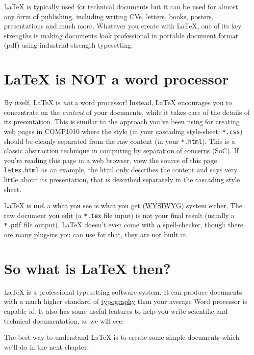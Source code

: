 \documentclass[
]{book}
\begin{document}
LaTeX is typically used for technical documents but it can be used for almost any form of publishing, including writing CVs, letters, books, posters, presentations and much more. Whatever you create with LaTeX, one of its key strengths is making documents look professional in portable document format (pdf) using industrial-strength typesetting.

\section{LaTeX is NOT a word processor}\label{notword}

By itself, LaTeX is \emph{not} a word processor! Instead, LaTeX encourages you to concentrate on the \emph{content} of your documents, while it takes care of the details of its presentation. This is similar to the approach you've been using for creating web pages in COMP1010 where the style (in your cascading style-sheet: \texttt{*.css}) should be cleanly separated from the raw content (in your \texttt{*.html}). This is a classic abstraction technique in computing by \href{https://en.wikipedia.org/wiki/Separation_of_concerns}{separation of concerns} (SoC). If you're reading this page in a web browser, view the source of this page \texttt{latex.html} as an example, the html only describes the content and says very little about its presentation, that is described separately in the cascading style sheet.

LaTeX is \textbf{not} a what you see is what you get (\href{https://en.wikipedia.org/wiki/WYSIWYG}{WYSIWYG}) system either. The raw document you edit (a \texttt{*.tex} file input) is not your final result (usually a \texttt{*.pdf} file output). LaTeX doesn't even come with a spell-checker, though there are many plug-ins you can use for that, they are not built in.

\section{So what is LaTeX then?}\label{so-what-is-latex-then}

LaTeX is a professional typesetting software system. It can produce documents with a much higher standard of \href{https://en.wikipedia.org/wiki/Typography}{typography} than your average Word processor is capable of. It also has some useful features to help you write scientific and technical documentation, as we will see.

The best way to understand LaTeX is to create some simple documents which we'll do in the next chapter.
\end{document}
